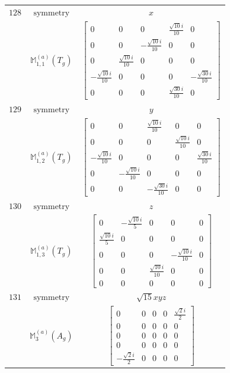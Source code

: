 \documentclass[fleqn,8pt,landscape]{jsarticle}
\begin{document}
\begin{longtable}{ccc}
$ 128 $ & $ \text{symmetry} $ & $ x $ \\
$  $ & $ \mathbb{M}_{1,1}^{(a)}(T_{g}) $ & $ \begin{bmatrix} 0 & 0 & 0 & \frac{\sqrt{10} i}{10} & 0 \\ 0 & 0 & - \frac{\sqrt{10} i}{10} & 0 & 0 \\ 0 & \frac{\sqrt{10} i}{10} & 0 & 0 & 0 \\ - \frac{\sqrt{10} i}{10} & 0 & 0 & 0 & - \frac{\sqrt{30} i}{10} \\ 0 & 0 & 0 & \frac{\sqrt{30} i}{10} & 0 \end{bmatrix} $ \\ \hline
$ 129 $ & $ \text{symmetry} $ & $ y $ \\
$  $ & $ \mathbb{M}_{1,2}^{(a)}(T_{g}) $ & $ \begin{bmatrix} 0 & 0 & \frac{\sqrt{10} i}{10} & 0 & 0 \\ 0 & 0 & 0 & \frac{\sqrt{10} i}{10} & 0 \\ - \frac{\sqrt{10} i}{10} & 0 & 0 & 0 & \frac{\sqrt{30} i}{10} \\ 0 & - \frac{\sqrt{10} i}{10} & 0 & 0 & 0 \\ 0 & 0 & - \frac{\sqrt{30} i}{10} & 0 & 0 \end{bmatrix} $ \\ \hline
$ 130 $ & $ \text{symmetry} $ & $ z $ \\
$  $ & $ \mathbb{M}_{1,3}^{(a)}(T_{g}) $ & $ \begin{bmatrix} 0 & - \frac{\sqrt{10} i}{5} & 0 & 0 & 0 \\ \frac{\sqrt{10} i}{5} & 0 & 0 & 0 & 0 \\ 0 & 0 & 0 & - \frac{\sqrt{10} i}{10} & 0 \\ 0 & 0 & \frac{\sqrt{10} i}{10} & 0 & 0 \\ 0 & 0 & 0 & 0 & 0 \end{bmatrix} $ \\ \hline
$ 131 $ & $ \text{symmetry} $ & $ \sqrt{15} x y z $ \\
$  $ & $ \mathbb{M}_{3}^{(a)}(A_{g}) $ & $ \begin{bmatrix} 0 & 0 & 0 & 0 & \frac{\sqrt{2} i}{2} \\ 0 & 0 & 0 & 0 & 0 \\ 0 & 0 & 0 & 0 & 0 \\ 0 & 0 & 0 & 0 & 0 \\ - \frac{\sqrt{2} i}{2} & 0 & 0 & 0 & 0 \end{bmatrix} $ \\ \hline

\end{longtable}
\end{document}
